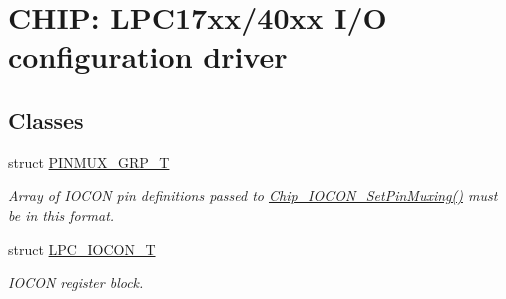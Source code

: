 \hypertarget{group___i_o_c_o_n__17_x_x__40_x_x}{\section{C\+H\+I\+P\+: L\+P\+C17xx/40xx I/\+O configuration driver}
\label{group___i_o_c_o_n__17_x_x__40_x_x}
}
\subsection*{Classes}
\begin{DoxyCompactItemize}
\item 
struct \hyperlink{struct_p_i_n_m_u_x___g_r_p___t}{P\+I\+N\+M\+U\+X\+\_\+\+G\+R\+P\+\_\+\+T}
\begin{DoxyCompactList}\small\item\em Array of I\+O\+C\+O\+N pin definitions passed to \hyperlink{group___i_o_c_o_n__17_x_x__40_x_x_gad97c96e401016cf296e6d20454f1c522}{Chip\+\_\+\+I\+O\+C\+O\+N\+\_\+\+Set\+Pin\+Muxing()} must be in this format. \end{DoxyCompactList}\item 
struct \hyperlink{struct_l_p_c___i_o_c_o_n___t}{L\+P\+C\+\_\+\+I\+O\+C\+O\+N\+\_\+\+T}
\begin{DoxyCompactList}\small\item\em I\+O\+C\+O\+N register block. \end{DoxyCompactList}\end{DoxyCompactItemize}
